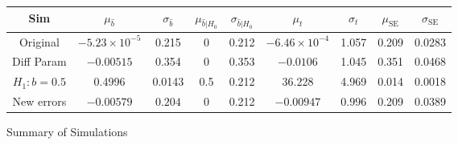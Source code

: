 \documentclass{amsart}
\DeclareMathOperator{\SE}{\text{SE}}
\begin{document}
		\begin{figure}[t]
			\begin{tabular}{c|cccccccc}
				Sim & $\mu_{\hat{b}}$ & $\sigma_{\hat{b}}$ & $\mu_{\hat{b} | H_{0}}$ & $\sigma_{\hat{b} | H_{0}}$ & $\mu_{t}$ & $\sigma_{t}$ & $\mu_{\SE}$ & $\sigma_{\SE}$ \\
				\hline
				\hline
				Original & $-5.23\times 10^{-5}$ & 0.215 & 0 & 0.212 & $-6.46\times 10^{-4}$ & 1.057 & 0.209 & 0.0283 \\
				\hline
				Diff Param & $-0.00515$ & 0.354 & 0 & 0.353 & $-0.0106$ & 1.045 & 0.351 & 0.0468 \\
				\hline
				$H_{1}: b = 0.5$ & 0.4996 & 0.0143 & 0.5 & 0.212 & 36.228 & 4.969 & 0.014 & 0.0018 \\
				\hline
				New errors & $-0.00579$ & $0.204$ & 0 & 0.212 & $-0.00947$ & $0.996$ & 0.209 & 0.0389 \\
				\hline
			\end{tabular}
			\caption{Summary of Simulations}
			\label{simsum}
		\end{figure}
\end{document}
